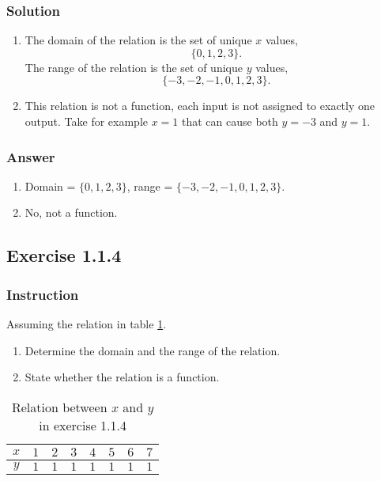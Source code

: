 \documentclass[11pt, letterpaper, oneside]{memoir}
\begin{document}
\subsubsection{Solution}

\begin{enumerate}[label=(\alph*)]
  \item The domain of the relation is the set of unique $ x $ values,
    $$ \phantom{.}
    \{ 0, 1, 2, 3 \}
    .$$
    The range of the relation is the set of unique $ y $ values,
    $$ \phantom{.}
    \{ -3, -2, -1, 0, 1, 2, 3 \}
    .$$
  \item This relation is not a function, each input is not assigned to exactly one output. Take for example $ x = 1 $ that can cause both $ y = -3 $ and $ y = 1 $.
\end{enumerate}

\subsubsection{Answer}

\begin{enumerate}[label=(\alph*)]
  \item Domain = $ \{ 0, 1, 2, 3 \} $, range = $ \{ -3, -2, -1, 0, 1, 2, 3 \} $.
  \item No, not a function.
\end{enumerate}

\subsection*{Exercise 1.1.4}

\subsubsection{Instruction}

Assuming the relation in table \ref{table:exercise-1.1.4}.
\begin{enumerate}[label=(\alph*)]
  \item Determine the domain and the range of the relation.
  \item State whether the relation is a function.
\end{enumerate}

\begin{table}[ht]
  \centering
  \begin{tabular}{ c | r r r r r r r }
    \hline
    $ x $ & $ 1 $ & $ 2 $ & $ 3 $ & $ 4 $ & $ 5 $ & $ 6 $ & $ 7 $ \\
    \hline
    $ y $ & $ 1 $ & $ 1 $ & $ 1 $ & $ 1 $ & $ 1 $ & $ 1 $ & $ 1 $ \\
    \hline
  \end{tabular}
  \caption{Relation between $ x $ and $ y $ in exercise 1.1.4}
  \label{table:exercise-1.1.4}
\end{table}
\end{document}
